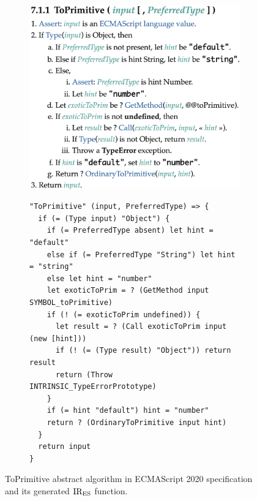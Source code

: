 \begin{figure}[t]
  \centering
  \begin{subfigure}{0.4\textwidth}
    \includegraphics[width=\textwidth]{img/to_primitive.png}
    \label{fig:to-primitive-es}
  \end{subfigure}
  \qquad
  \begin{subfigure}{0.48\textwidth}
    \begin{lstlisting}[style=ires]
"ToPrimitive" (input, PreferredType) => {
  if (= (Type input) "Object") {
    if (= PreferredType absent) let hint = "default"
    else if (= PreferredType "String") let hint = "string"
    else let hint = "number"
    let exoticToPrim = ? (GetMethod input SYMBOL_toPrimitive)
    if (! (= exoticToPrim undefined)) {
      let result = ? (Call exoticToPrim input (new [hint]))
      if (! (= (Type result) "Object")) return result
      return (Throw INTRINSIC_TypeErrorPrototype)
    }
    if (= hint "default") hint = "number"
    return ? (OrdinaryToPrimitive input hint)
  }
  return input
}
    \end{lstlisting}
    \label{fig:to-primitive-ires}
  \end{subfigure}
  \caption{ToPrimitive abstract algorithm in ECMAScript 2020 specification and its generated \( \text{IR}_\text{ES} \) function.}
  \label{fig:to-primitive}
\end{figure}

